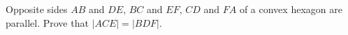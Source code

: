 Opposite sides $AB$ and $DE$, $BC$ and $EF$, $CD$ and $FA$ of a convex hexagon are parallel. Prove that $|ACE| = |BDF|$.
